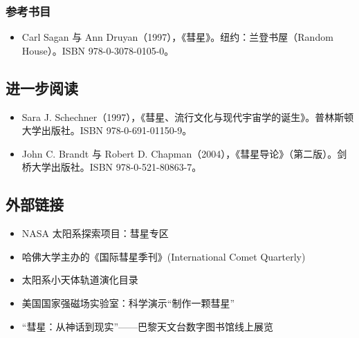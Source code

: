 \subsubsection{参考书目}
\begin{itemize}
\item Carl Sagan 与 Ann Druyan（1997），《彗星》。纽约：兰登书屋（Random House）。ISBN 978-0-3078-0105-0。
\end{itemize}
\subsection{进一步阅读}
\begin{itemize}
\item Sara J. Schechner（1997），《彗星、流行文化与现代宇宙学的诞生》。普林斯顿大学出版社。ISBN 978-0-691-01150-9。
\item John C. Brandt 与 Robert D. Chapman（2004），《彗星导论》（第二版）。剑桥大学出版社。ISBN 978-0-521-80863-7。
\end{itemize}
\subsection{外部链接}
\begin{itemize}
\item NASA 太阳系探索项目：彗星专区
\item 哈佛大学主办的《国际彗星季刊》(International Comet Quarterly)
\item 太阳系小天体轨道演化目录
\item 美国国家强磁场实验室：科学演示“制作一颗彗星”
\item “彗星：从神话到现实”——巴黎天文台数字图书馆线上展览
\end{itemize}


